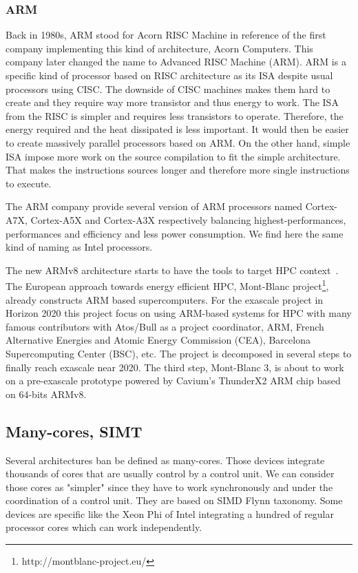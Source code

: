 \subsubsection{ARM}
Back in 1980s, ARM stood for Acorn RISC Machine in reference of the first company implementing this kind of architecture, Acorn Computers. 
This company later changed the name to Advanced RISC Machine (ARM). 
ARM is a specific kind of processor based on RISC architecture as its ISA despite usual processors using CISC.
The downside of CISC machines makes them hard to create and they require way more transistor and thus energy to work. 
The ISA from the RISC is simpler and requires less transistors to operate. 
Therefore, the energy required and the heat dissipated is less important. 
It would then be easier to create massively parallel processors based on ARM. 
On the other hand, simple ISA impose more work on the source compilation to fit the simple architecture. 
That makes the instructions sources longer and therefore more single instructions to execute. 

The ARM company provide several version of ARM processors named Cortex-A7X, Cortex-A5X and Cortex-A3X respectively balancing highest-performances, performances and efficiency and less power consumption. 
We find here the same kind of naming as Intel processors. 

The new ARMv8 architecture starts to have the tools to target HPC context~\cite{rico2017arm}.
The European approach towards energy efficient HPC, Mont-Blanc project\footnote{http://montblanc-project.eu/}, already constructs ARM based supercomputers. 
For the exascale project in Horizon 2020 this project focus on using ARM-based systems for HPC with many famous contributors with Atos/Bull as a project coordinator, ARM, French Alternative Energies and Atomic Energy Commission (CEA), Barcelona Supercomputing Center (BSC), etc.
The project is decomposed in several steps to finally reach exascale near 2020. 
The third step, Mont-Blanc 3, is about to work on a pre-exascale prototype powered by Cavium’s ThunderX2 ARM chip based on 64-bits ARMv8.

\subsection{Many-cores, SIMT}
Several architectures ban be defined as many-cores. 
Those devices integrate thousands of cores that are usually control by a control unit. 
We can consider those cores as "simpler" since they have to work synchronously and under the coordination of a control unit.
They are based on SIMD Flynn taxonomy. 
Some devices are specific like the Xeon Phi of Intel integrating a hundred of regular processor cores which can work independently. 

